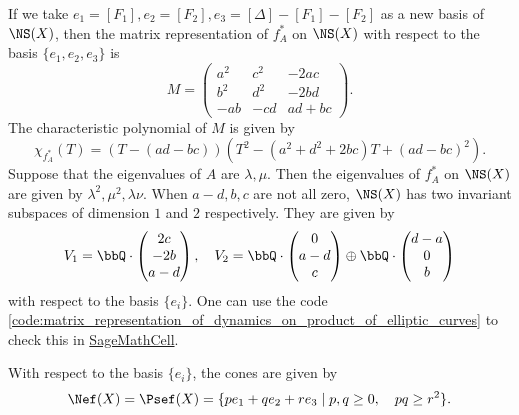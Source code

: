 \begin{example}
        If we take \(e_1= [F_1],e_2=[F_2],e_3=[\Delta]-[F_1]-[F_2]\) as a new basis of \(\NS(X)\), then the matrix representation of \(f_A^*\) on \(\NS(X)\) with respect to the basis \(\{e_1,e_2,e_3\}\) is
        \[
            M = \begin{pmatrix}
                a^2 & c^2 & -2ac \\
                b^2 & d^2 & -2bd \\
                -ab & -cd & ad+bc
            \end{pmatrix}.
        \]
        The characteristic polynomial of \(M\) is given by
        \[ \chi_{f_A^*}(T) = (T - (ad-bc))(T^2 - (a^2+d^2+2bc)T + (ad-bc)^2). \]
        Suppose that the eigenvalues of \(A\) are \(\lambda, \mu\).
        Then the eigenvalues of \(f_A^*\) on \(\NS(X)\) are given by \(\lambda^2, \mu^2, \lambda \nu\).
        When \(a-d,b,c\) are not all zero, \(\NS(X)\) has two invariant subspaces of dimension \(1\) and \(2\) respectively.
        They are given by 
        \[ V_1 = \bbQ \cdot \begin{pmatrix}
            2c \\
            -2b \\
            a-d
        \end{pmatrix}, \quad V_2 = \bbQ \cdot \begin{pmatrix}
            0 \\
            a-d \\
            c
        \end{pmatrix} \oplus \bbQ \cdot \begin{pmatrix}
            d-a \\
            0 \\
            b
        \end{pmatrix} \]
        with respect to the basis \(\{e_i\}\).
        One can use the code \cref{code:matrix_representation_of_dynamics_on_product_of_elliptic_curves} to check this in \href{https://sagecell.sagemath.org/}{SageMathCell}.

        With respect to the basis \(\{e_i\}\), the cones are given by
        \[ \Nef(X) = \Psef(X) = \{p e_1 + q e_2 + r e_3 \mid p,q \geq 0, \quad pq \geq r^2\}. \]
    \end{example}
    

